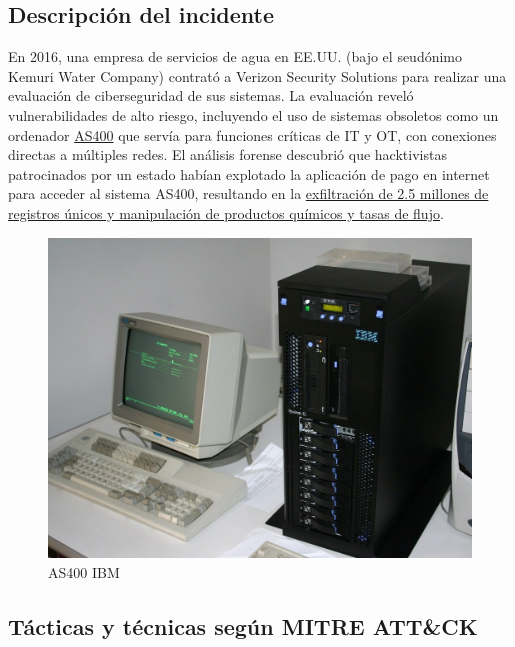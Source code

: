 \subsection{Descripción del incidente}
\begin{paracol}{2}
    \colfill
    En 2016, una empresa de servicios de agua en EE.UU. (bajo el seudónimo Kemuri Water Company) contrató a Verizon Security Solutions para realizar una evaluación de ciberseguridad de sus sistemas. La evaluación reveló vulnerabilidades de alto riesgo, incluyendo el uso de sistemas obsoletos como un ordenador \href{https://it.wikipedia.org/wiki/IBM_AS/400}{\textsc{AS400}} que servía para funciones críticas de \textsc{IT} y \textsc{OT}, con conexiones directas a múltiples redes. El análisis forense descubrió que hacktivistas patrocinados por un estado habían explotado la aplicación de pago en internet para acceder al sistema AS400, resultando en la \ul{exfiltración de 2.5 millones de registros únicos y manipulación de productos químicos y tasas de flujo}.
    \colfill
    
    \switchcolumn

    \begin{figure}[htbp]
        \centering
        \includegraphics[width=0.95\columnwidth]{images/AS400.jpg}
        \caption{AS400 IBM}
        \label{fig:AS400}
    \end{figure}
\end{paracol}


\subsection{Tácticas y técnicas según MITRE ATT\&CK}

